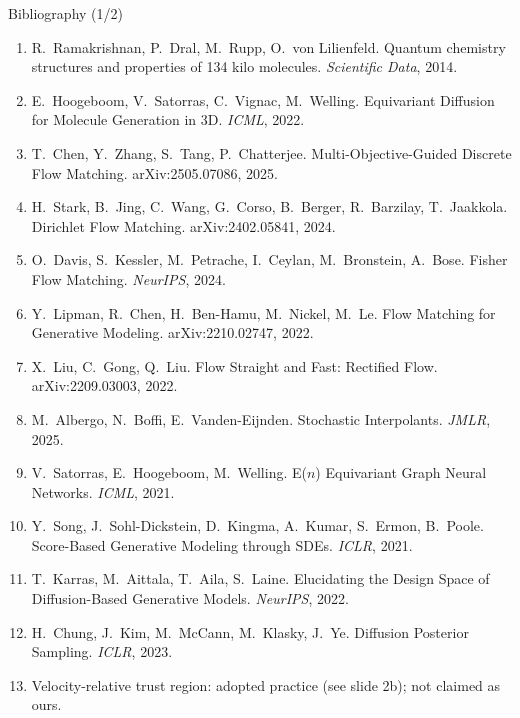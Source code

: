 \documentclass[aspectratio=169,10pt]{beamer}
\newcommand{\theslidelabel}{}
\newcommand{\lbl}[1]{\renewcommand{\theslidelabel}{#1}}
\begin{document}
\lbl{}
\begin{frame}{Bibliography (1/2)}
  {\scriptsize
  \begin{enumerate}\setlength\itemsep{0.05em}
    \item R.\ Ramakrishnan, P.\ Dral, M.\ Rupp, O.\ von Lilienfeld. Quantum chemistry structures and properties of 134 kilo molecules. \emph{Scientific Data}, 2014.
    \item E.\ Hoogeboom, V.\ Satorras, C.\ Vignac, M.\ Welling. Equivariant Diffusion for Molecule Generation in 3D. \emph{ICML}, 2022.
    \item T.\ Chen, Y.\ Zhang, S.\ Tang, P.\ Chatterjee. Multi-Objective-Guided Discrete Flow Matching. arXiv:2505.07086, 2025.
    \item H.\ Stark, B.\ Jing, C.\ Wang, G.\ Corso, B.\ Berger, R.\ Barzilay, T.\ Jaakkola. Dirichlet Flow Matching. arXiv:2402.05841, 2024.
    \item O.\ Davis, S.\ Kessler, M.\ Petrache, I.\ Ceylan, M.\ Bronstein, A.\ Bose. Fisher Flow Matching. \emph{NeurIPS}, 2024.
    \item Y.\ Lipman, R.\ Chen, H.\ Ben-Hamu, M.\ Nickel, M.\ Le. Flow Matching for Generative Modeling. arXiv:2210.02747, 2022.
    \item X.\ Liu, C.\ Gong, Q.\ Liu. Flow Straight and Fast: Rectified Flow. arXiv:2209.03003, 2022.
    \item M.\ Albergo, N.\ Boffi, E.\ Vanden-Eijnden. Stochastic Interpolants. \emph{JMLR}, 2025.
    \item V.\ Satorras, E.\ Hoogeboom, M.\ Welling. E($n$) Equivariant Graph Neural Networks. \emph{ICML}, 2021.
    \item Y.\ Song, J.\ Sohl-Dickstein, D.\ Kingma, A.\ Kumar, S.\ Ermon, B.\ Poole. Score-Based Generative Modeling through SDEs. \emph{ICLR}, 2021.
    \item T.\ Karras, M.\ Aittala, T.\ Aila, S.\ Laine. Elucidating the Design Space of Diffusion-Based Generative Models. \emph{NeurIPS}, 2022.
    \item H.\ Chung, J.\ Kim, M.\ McCann, M.\ Klasky, J.\ Ye. Diffusion Posterior Sampling. \emph{ICLR}, 2023.
    \item Velocity-relative trust region: adopted practice (see slide 2b); not claimed as ours.
  \end{enumerate}}
\end{frame}
\end{document}
